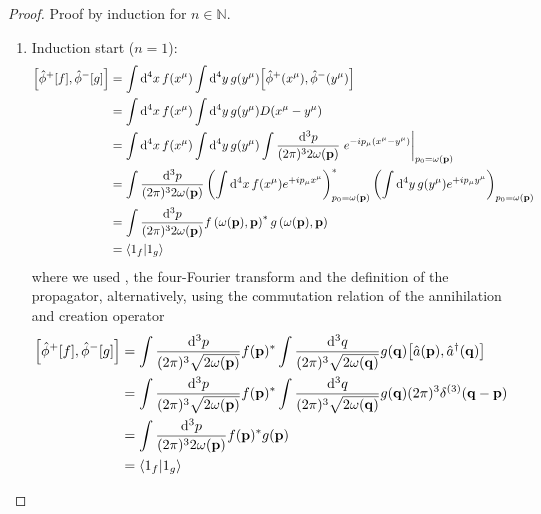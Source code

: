 \begin{proof}
	Proof by induction for $n\in\mathbb{N}$.
	\begin{enumerate}
		\item Induction start ($n=1$):
		\begin{equation*}
			\begin{split}
				\comm{\hat\phi^+[f]}{\hat\phi^-[g]}
				&=
				\int\dd[4]{x}f(x^\mu)
				\int\dd[4]{y}g(y^\mu)
				\comm{\hat\phi^+(x^\mu)}{\hat\phi^-(y^\mu)}
				\\
				&=
				\int\dd[4]{x}f(x^\mu)
				\int\dd[4]{y}g(y^\mu)
				D(x^\mu-y^\mu)
				\\
				&=
				\int\dd[4]{x}f(x^\mu)
				\int\dd[4]{y}g(y^\mu)
				\int\frac{\dd[3]{p}}{(2\pi)^32\omega(\vb{p})}
				\eval{e^{-ip_\mu(x^\mu-y^\mu)}}_{p_0=\omega(\vb{p})}
				\\
				&=
				\int\frac{\dd[3]{p}}{(2\pi)^32\omega(\vb{p})}
				\left(
					\int\dd[4]{x}
					f(x^\mu)
					e^{+ip_\mu x^\mu}
				\right)^*_{p_0=\omega(\vb{p})}
				\left(
					\int\dd[4]{y}
					g(y^\mu)
					e^{+ip_\mu y^\mu}
				\right)_{p_0=\omega(\vb{p})}
				\\
				&=
				\int\frac{\dd[3]{p}}{(2\pi)^32\omega(\vb{p})}
				f\left(\omega(\vb{p}),\vb{p}\right)^*
				g\left(\omega(\vb{p}),\vb{p}\right)
				\\
				&=
				\braket{1_f}{1_g}
			\end{split}
		\end{equation*}
		where we used , the four-Fourier transform and the definition of the propagator, alternatively, using the commutation relation of the annihilation and creation operator
		\begin{equation*}
			\begin{split}
				\comm{\hat\phi^+[f]}{\hat\phi^-[g]}
				&=
				\int\frac{\dd[3]{p}}{(2\pi)^3\sqrt{2\omega(\vb{p})}}
				f(\vb{p})^*
				\int\frac{\dd[3]{q}}{(2\pi)^3\sqrt{2\omega(\vb{q})}}
				g(\vb{q})
				\comm{\hat{a}(\vb{p})}{\hat{a}^\dagger(\vb{q})}
				\\
				&=
				\int\frac{\dd[3]{p}}{(2\pi)^3\sqrt{2\omega(\vb{p})}}
				f(\vb{p})^*
				\int\frac{\dd[3]{q}}{(2\pi)^3\sqrt{2\omega(\vb{q})}}
				g(\vb{q})
				(2\pi)^3\delta^{(3)}(\vb{q}-\vb{p})
				\\
				&=
				\int\frac{\dd[3]{p}}{(2\pi)^32\omega(\vb{p})}
				f(\vb{p})^*
				g(\vb{p})
				\\
				&=
				\braket{1_f}{1_g}
			\end{split}
		\end{equation*}

\end{enumerate}
\end{proof}
